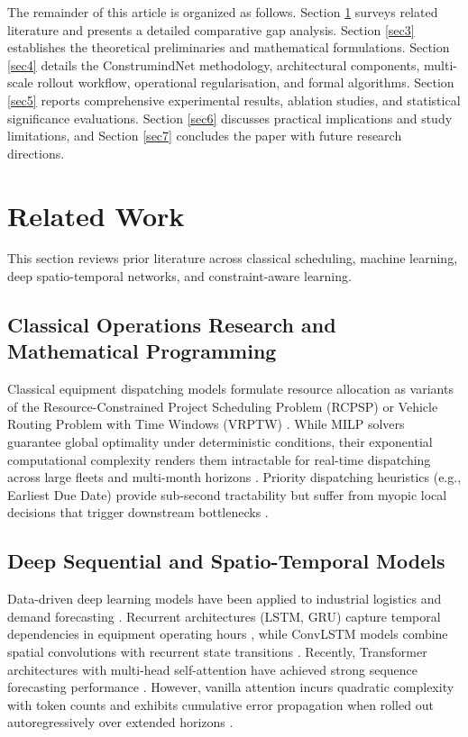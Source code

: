 \documentclass[pdflatex,sn-mathphys,Numbered]{sn-jnl}%
\begin{document}
The remainder of this article is organized as follows. Section \ref{sec2} surveys related literature and presents a detailed comparative gap analysis. Section \ref{sec3} establishes the theoretical preliminaries and mathematical formulations. Section \ref{sec4} details the ConstrumindNet methodology, architectural components, multi-scale rollout workflow, operational regularisation, and formal algorithms. Section \ref{sec5} reports comprehensive experimental results, ablation studies, and statistical significance evaluations. Section \ref{sec6} discusses practical implications and study limitations, and Section \ref{sec7} concludes the paper with future research directions.

\section{Related Work}\label{sec2}
This section reviews prior literature across classical scheduling, machine learning, deep spatio-temporal networks, and constraint-aware learning.

\subsection{Classical Operations Research and Mathematical Programming}
Classical equipment dispatching models formulate resource allocation as variants of the Resource-Constrained Project Scheduling Problem (RCPSP) or Vehicle Routing Problem with Time Windows (VRPTW) \cite{hossain2025,meng2025}. While MILP solvers guarantee global optimality under deterministic conditions, their exponential computational complexity renders them intractable for real-time dispatching across large fleets and multi-month horizons \cite{wang2025}. Priority dispatching heuristics (e.g., Earliest Due Date) provide sub-second tractability but suffer from myopic local decisions that trigger downstream bottlenecks \cite{ejiyi2025}.

\subsection{Deep Sequential and Spatio-Temporal Models}
Data-driven deep learning models have been applied to industrial logistics and demand forecasting \cite{russo2025,chiranjeevi2025}. Recurrent architectures (LSTM, GRU) capture temporal dependencies in equipment operating hours \cite{inam2024}, while ConvLSTM models combine spatial convolutions with recurrent state transitions \cite{shin2023}. Recently, Transformer architectures with multi-head self-attention have achieved strong sequence forecasting performance \cite{inam2025a,li2025}. However, vanilla attention incurs quadratic complexity with token counts and exhibits cumulative error propagation when rolled out autoregressively over extended horizons \cite{liu2025}.
\end{document}
